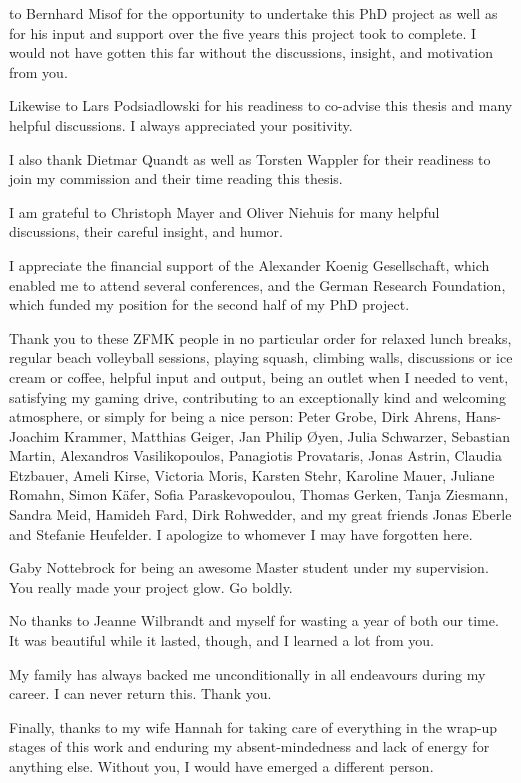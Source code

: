 
 to Bernhard Misof for the opportunity to
undertake this PhD project as well as for his input and support over the
five years this project took to complete.  I would not have gotten this
far without the discussions, insight, and motivation from you.

Likewise to Lars Podsiadlowski for his readiness to co-advise this
thesis and many helpful discussions.  I always appreciated your
positivity.

I also thank Dietmar Quandt as well as Torsten Wappler for their
readiness to join my commission and their time reading this thesis.

I am grateful to Christoph Mayer and Oliver Niehuis for many helpful
discussions, their careful insight, and humor.

I appreciate the financial support of the Alexander Koenig Gesellschaft,
which enabled me to attend several conferences, and the German Research
Foundation, which funded my position for the second half of my PhD
project.

Thank you to these ZFMK people in no particular order for relaxed lunch
breaks, regular beach volleyball sessions, playing squash, climbing
walls, discussions or ice cream or coffee, helpful input and output,
being an outlet when I needed to vent, satisfying my gaming drive,
contributing to an exceptionally kind and welcoming atmosphere, or
simply for being a nice person:
%
Peter Grobe, Dirk Ahrens, Hans-Joachim Krammer, Matthias Geiger, Jan
Philip \O{}yen, Julia Schwarzer, Sebastian Martin, Alexandros
Vasilikopoulos, Panagiotis Provataris, Jonas Astrin, Claudia Etzbauer,
Ameli Kirse, Victoria Moris, Karsten Stehr, Karoline Mauer, Juliane
Romahn, Simon K\"afer, Sofia Paraskevopoulou, Thomas Gerken, Tanja
Ziesmann, Sandra Meid, Hamideh Fard, Dirk Rohwedder, and my great
friends Jonas Eberle and Stefanie Heufelder.  I apologize to whomever I
may have forgotten here.

Gaby Nottebrock for being an awesome Master student under my
supervision.  You really made your project glow.  Go boldly.

No thanks to Jeanne Wilbrandt and myself for wasting a year of both our
time.  It was beautiful while it lasted, though, and I learned a lot
from you.

My family has always backed me unconditionally in all endeavours during
my career.  I can never return this.  Thank you.

Finally, thanks to my wife Hannah for taking care of everything in the
wrap-up stages of this work and enduring my absent-mindedness and lack
of energy for anything else.  Without you, I would have emerged a
different person.
